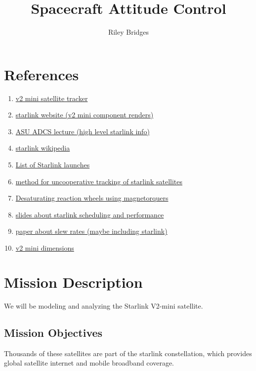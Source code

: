 \documentclass[11pt]{article}
\title{Spacecraft Attitude Control}
\author{Riley Bridges}
\begin{document}
\maketitle

\section{References}
\begin{enumerate}
  \item \href{https://space.skyrocket.de/doc_sdat/starlink-v2-mini.htm}{v2 mini satellite tracker}
  \item \href{https://starlink.com/technology}{starlink website (v2 mini component renders)}
  \item \href{https://control.asu.edu/Classes/MAE462/462Lecture15.pdf}{ASU ADCS lecture (high level starlink info)}
  \item \href{https://en.wikipedia.org/wiki/Starlink#Satellite_hardware}{starlink wikipedia}
  \item \href{https://en.wikipedia.org/wiki/List_of_Starlink_and_Starshield_launches}{List of Starlink launches}
  \item \href{https://www.mdpi.com/1424-8220/25/13/4079}{method for uncooperative tracking of starlink satellites}
  \item \href{https://apps.dtic.mil/sti/citations/AD0817503}{Desaturating reaction wheels using magnetorquers}
  \item \href{https://www.ietf.org/slides/slides-iepg-starlink-protocol-performance-00.pdf}{slides about starlink scheduling and performance}
  \item \href{https://digitalcommons.usu.edu/cgi/viewcontent.cgi?filename=0&article=4867&context=smallsat&type=additional}{paper about slew rates (maybe including starlink)}
  \item \href{https://www.teslarati.com/spacex-unveils-next-gen-starlink-v2-mini-satellites-ahead-of-monday-launch/}{v2 mini dimensions}
\end{enumerate}
\section{Mission Description}
We will be modeling and analyzing the Starlink V2-mini satellite. 
\subsection{Mission Objectives}
Thousands of these satellites are part of the starlink constellation, which provides global satellite internet and mobile broadband coverage.
\end{document}
